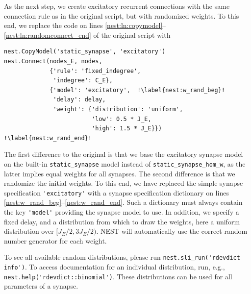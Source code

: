 \documentclass{article}
\begin{document}
As the next step, we create excitatory recurrent connections with the
same connection rule as in the original script, but with randomized
weights. To this end, we replace the code on lines
\ref{nest:ln:copymodel}--\ref{nest:ln:randomconnect_end} of the original
script with
\begin{lstlisting}[name=brunel-rand]
nest.CopyModel('static_synapse', 'excitatory')
nest.Connect(nodes_E, nodes,
             {'rule': 'fixed_indegree', 
              'indegree': C_E},
             {'model': 'excitatory',  !\label{nest:w_rand_beg}!
              'delay': delay,
              'weight': {'distribution': 'uniform',
                         'low': 0.5 * J_E, 
                         'high': 1.5 * J_E}}) !\label{nest:w_rand_end}!
\end{lstlisting}
The first difference to the original is that we base the excitatory
synapse model on the built-in \lstinline!static_synapse! model instead
of \lstinline!static_synapse_hom_w!, as the latter implies equal
weights for all synapses. The second difference is that we randomize
the initial weights. To this end, we have replaced the simple synapse
specification \lstinline!'excitatory'! with a synapse specification
dictionary on lines \ref{nest:w_rand_beg}--\ref{nest:w_rand_end}. Such
a dictionary must always contain the key \lstinline!'model'! providing
the synapse model to use. In addition, we specify a fixed delay, and a
distribution from which to draw the weights, here a uniform
distribution over $[J_E/2, 3J_E/2)$. NEST will automatically use the
correct random number generator for each weight. 

To see all available random distributions, please run
\lstinline!nest.sli_run('rdevdict info')!. To access documentation for
an individual distribution, run, e.g., \lstinline!nest.help('rdevdict::binomial')!.
These distributions can be
used for all parameters of a synapse.
\end{document}
